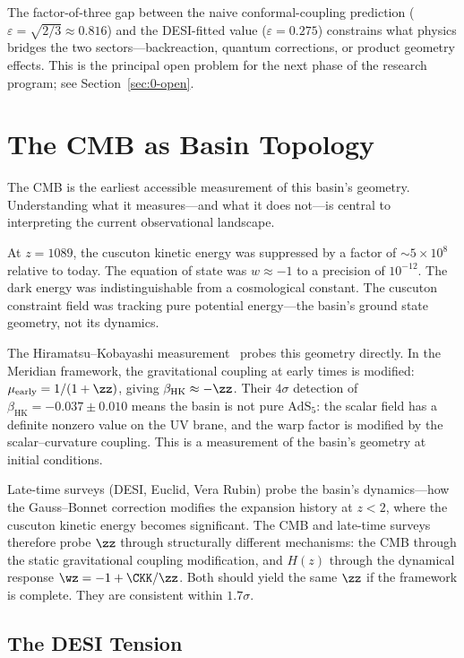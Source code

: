 The factor-of-three gap between the naive conformal-coupling prediction
($\varepsilon = \sqrt{2/3} \approx 0.816$) and the DESI-fitted value
($\varepsilon = 0.275$) constrains what physics bridges the two
sectors---backreaction, quantum corrections, or product geometry
effects. This is the principal open problem for the next phase of the
research program; see Section~\ref{sec:0-open}.

\section{The CMB as Basin Topology}
\label{sec:0-cmb}

The CMB is the earliest accessible measurement of this basin's
geometry. Understanding what it measures---and what it does not---is
central to interpreting the current observational landscape.

At $z = 1089$, the cuscuton kinetic energy was suppressed by a factor
of $\sim 5 \times 10^8$ relative to today. The equation of state was
$w \approx -1$ to a precision of $10^{-12}$. The dark energy was
indistinguishable from a cosmological constant. The cuscuton
constraint field was tracking pure potential energy---the basin's
ground state geometry, not its dynamics.

The Hiramatsu--Kobayashi measurement~\cite{ch2:Hiramatsu2022} probes
this geometry directly. In the Meridian framework, the gravitational
coupling at early times is modified:
$\mu_{\mathrm{early}} = 1/(1 + \zz)$, giving
$\beta_{\mathrm{HK}} \approx -\zz$. Their $4\sigma$ detection of
$\beta_{\mathrm{HK}} = -0.037 \pm 0.010$ means the basin is not pure
$\mathrm{AdS}_5$: the scalar field has a definite nonzero value on the
UV brane, and the warp factor is modified by the scalar--curvature
coupling. This is a measurement of the basin's geometry at initial
conditions.

Late-time surveys (DESI, Euclid, Vera Rubin) probe the basin's
dynamics---how the Gauss--Bonnet correction modifies the expansion
history at $z < 2$, where the cuscuton kinetic energy becomes
significant. The CMB and late-time surveys therefore probe $\zz$
through structurally different mechanisms: the CMB through the static
gravitational coupling modification, and $H(z)$ through the dynamical
response $\wz = -1 + \CKK / \zz$. Both should yield the same $\zz$ if
the framework is complete. They are consistent within $1.7\sigma$.

\subsection{The DESI Tension}
\label{sec:0-desi-tension}

